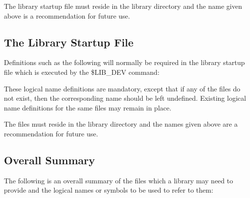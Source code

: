 \documentclass[noabs,11pt,nolof]{starlink}
\begin{document}
The library startup file must reside in the library directory and the name
given above is a recommendation for future use.

\subsection{The Library Startup File}

Definitions such as the following will normally be required in the library
startup file which is executed by the \$LIB\_DEV command:


These logical name definitions are mandatory, except that if any of the
files do not exist, then the corresponding name should be left undefined.
Existing logical name definitions for the same files may remain in place.

The files must reside in the library directory and the names given above are
a recommendation for future use.

\subsection{Overall Summary}

The following is an overall summary of the files which a library may need to
provide and the logical names or symbols to be used to refer to them:
\end{document}
